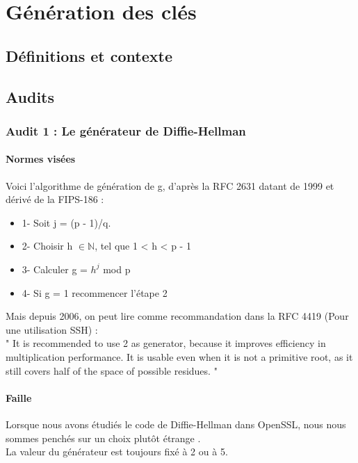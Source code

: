 \chapter{Génération des clés}
\section{Définitions et contexte}

\section{Audits}
	\subsection{Audit 1 : Le générateur de Diffie-Hellman}
		\subsubsection{Normes visées}

		Voici l'algorithme de génération de g, d'après la RFC 2631 \cite{rfc2631}
		datant de 1999 et dérivé de la FIPS-186 : \\
		\begin{itemize}
		\item 1- Soit j = (p - 1)/q.
		\item 2- Choisir h $\in \mathbb{N}$, tel que 1 < h < p - 1
		\item 3- Calculer g = $h^j$ mod p
		\item 4- Si g = 1 recommencer l'étape 2\\
		\end{itemize}
	
		Mais depuis 2006, on peut lire comme recommandation dans la RFC 4419 (Pour 
		une utilisation SSH) : \\
		" It is recommended to use 2 as generator, because it improves
		efficiency in multiplication performance.  It is usable even when it
		is not a primitive root, as it still covers half of the space of
		possible residues. "\\
	
		\subsubsection{Faille}
	
		Lorsque nous avons étudiés le code de Diffie-Hellman dans OpenSSL, nous nous
		sommes penchés sur un choix plutôt étrange . \\
		La valeur du générateur est toujours fixé à 2 ou à 5. \\
	
